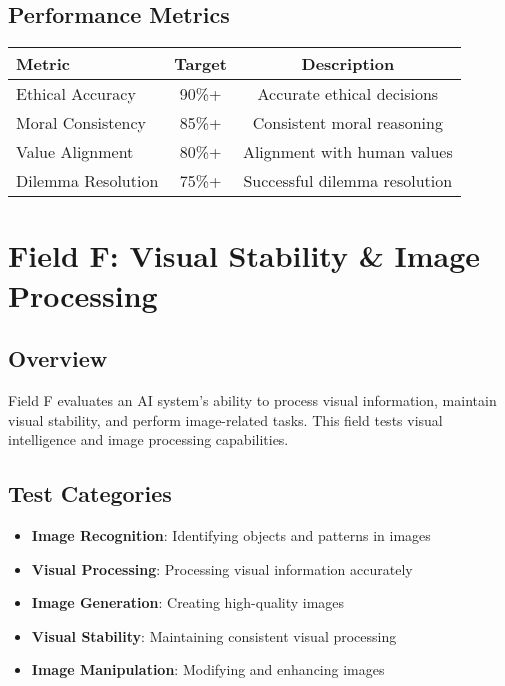 \documentclass[12pt,a4paper]{article}
\begin{document}
\subsection{Performance Metrics}
\begin{center}
\begin{tabular}{|l|c|c|}
\hline
\textbf{Metric} & \textbf{Target} & \textbf{Description} \\
\hline
Ethical Accuracy & 90\%+ & Accurate ethical decisions \\
Moral Consistency & 85\%+ & Consistent moral reasoning \\
Value Alignment & 80\%+ & Alignment with human values \\
Dilemma Resolution & 75\%+ & Successful dilemma resolution \\
\hline
\end{tabular}
\end{center}

\newpage

\section{Field F: Visual Stability \& Image Processing}

\subsection{Overview}
Field F evaluates an AI system's ability to process visual information, maintain visual stability, and perform image-related tasks. This field tests visual intelligence and image processing capabilities.

\subsection{Test Categories}
\begin{itemize}
    \item \textbf{Image Recognition}: Identifying objects and patterns in images
    \item \textbf{Visual Processing}: Processing visual information accurately
    \item \textbf{Image Generation}: Creating high-quality images
    \item \textbf{Visual Stability}: Maintaining consistent visual processing
    \item \textbf{Image Manipulation}: Modifying and enhancing images
\end{itemize}
\end{document}
